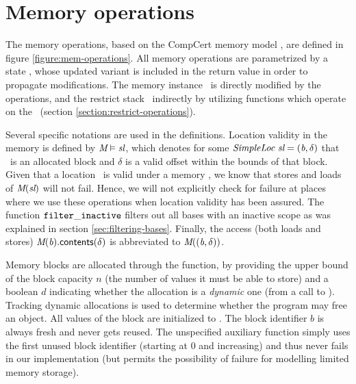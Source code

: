 \newpage

\section{Memory operations}\label{section:memory-operations} %
The memory operations, based on the CompCert memory model \cite{besson2015concrete}, are defined in figure \ref{figure:mem-operations}.
All memory operations are parametrized by a state \Statevar, whose updated variant is included in the return value in order to propagate modifications.
The memory instance \Memstatemember \ is directly modified by the operations, and the
restrict stack \Restrictstatemember \ indirectly by utilizing functions which operate on the \Restrictstack \ (section \ref{section:restrict-operations}).

Several specific notations are used in the definitions.
Location validity in the memory is defined by $\textit{M} \vDash \textit{sl}$, which denotes for some $\textit{SimpleLoc} \ \textit{sl} = (\textit{b}, \delta)$ that
\Blockvar \ is an allocated block and $\delta$ is a valid offset within the bounds of that block.
Given that a location \Simplelocvar \ is valid under a memory \Memvar, we know that
stores and loads of $\textit{M}(\textit{sl})$ will not fail.
Hence, we will not explicitly check for failure at places where we use these operations when
location validity has been assured.
The function $\mathtt{filter\_inactive}$ filters out all bases with an inactive scope as was explained in section \ref{sec:filtering-bases}.
Finally, the access (\ie both loads and stores) $\textit{M}(\textit{b}).\mathsf{contents}(\delta)$ is abbreviated to $\textit{M}((\textit{b}, \delta))$. 

Memory blocks are allocated through the  function, by providing the upper bound of the block capacity $n$ (the number of values
it must be able to store) and a boolean $d$ indicating whether the allocation is a \textit{dynamic} one (\ie from a call to ).
Tracking dynamic allocations is used to determine whether the program may free an object. %
All values of the block are initialized to \vundef.
The block identifier $b$ is always fresh and never gets reused.
The unspecified auxiliary function  simply uses the first unused block identifier (starting at 0 and increasing) 
and thus never fails in our implementation (but permits the possibility of failure for modelling limited memory storage).

